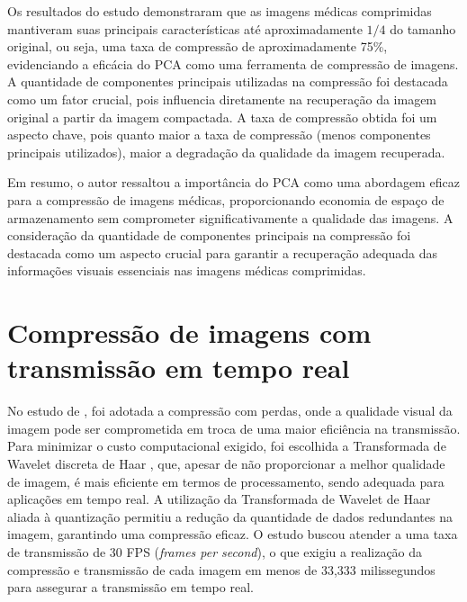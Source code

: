 Os resultados do estudo demonstraram que as imagens médicas comprimidas mantiveram suas principais características até aproximadamente $1/4$ do tamanho original, ou seja, uma taxa de compressão de aproximadamente 75\%, evidenciando a eficácia do \acrshort{PCA} como uma ferramenta de compressão de imagens. A quantidade de componentes principais utilizadas na compressão foi destacada como um fator crucial, pois influencia diretamente na recuperação da imagem original a partir da imagem compactada. A taxa de compressão obtida foi um aspecto chave, pois quanto maior a taxa de compressão (menos componentes principais utilizados), maior a degradação da qualidade da imagem recuperada.

Em resumo, o autor ressaltou a importância do \acrshort{PCA} como uma abordagem eficaz para a compressão de imagens médicas, proporcionando economia de espaço de armazenamento sem comprometer significativamente a qualidade das imagens. A consideração da quantidade de componentes principais na compressão foi destacada como um aspecto crucial para garantir a recuperação adequada das informações visuais essenciais nas imagens médicas comprimidas.

\section{Compressão de imagens com transmissão em tempo real}
No estudo de , foi adotada a compressão com perdas, onde a qualidade visual da imagem pode ser comprometida em troca de uma maior eficiência na transmissão. Para minimizar o custo computacional exigido, foi escolhida a Transformada de Wavelet discreta de Haar \cite{sousa2015compressaoTempoReal}, que, apesar de não proporcionar a melhor qualidade de imagem, é mais eficiente em termos de processamento, sendo adequada para aplicações em tempo real. A utilização da Transformada de Wavelet de Haar aliada à quantização permitiu a redução da quantidade de dados redundantes na imagem, garantindo uma compressão eficaz. O estudo buscou atender a uma taxa de transmissão de 30 FPS (\textit{frames per second}), o que exigiu a realização da compressão e transmissão de cada imagem em menos de 33,333 milissegundos para assegurar a transmissão em tempo real.


